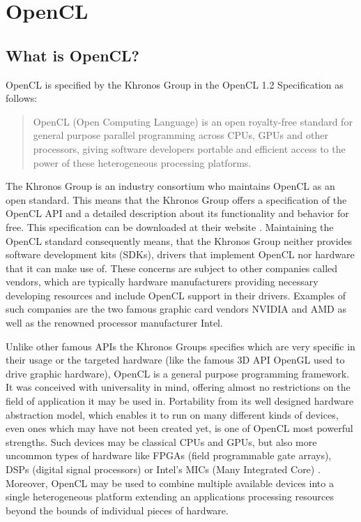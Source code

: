 \section{OpenCL}
\label{sec:opencl}

\subsection{What is OpenCL?}
OpenCL is specified by the Khronos Group in the OpenCL 1.2 Specification as follows:

\begin{quote}
OpenCL (Open Computing Language) is an open royalty-free standard for general purpose
parallel programming across CPUs, GPUs and other processors, giving software developers
portable and efficient access to the power of these heterogeneous processing platforms. \cite{opencl_spec}
\end{quote}

The Khronos Group is an industry consortium who maintains OpenCL as an open standard. This means that the Khronos Group offers a specification of the OpenCL API and a detailed description about its functionality and behavior for free. This specification can be downloaded at their website \cite{opencl_spec}. Maintaining the OpenCL standard consequently means, that the Khronos Group neither provides software development kits (SDKs), drivers that implement OpenCL nor hardware that it can make use of. These concerns are subject to other companies called vendors, which are typically hardware manufacturers providing necessary developing resources and include OpenCL support in their drivers. Examples of such companies are the two famous graphic card vendors NVIDIA and AMD as well as the renowned processor manufacturer Intel.

Unlike other famous APIs the Khronos Groups specifies which are very specific in their usage or the targeted hardware (like the famous 3D API OpenGL used to drive graphic hardware), OpenCL is a general purpose programming framework. It was conceived with universality in mind, offering almost no restrictions on the field of application it may be used in. Portability from its well designed hardware abstraction model, which enables it to run on many different kinds of devices, even ones which may have not been created yet, is one of OpenCL most powerful strengths. Such devices may be classical CPUs and GPUs, but also more uncommon types of hardware like FPGAs (field programmable gate arrays), DSPs (digital signal processors) or Intel's MICs (Many Integrated Core) \cite{mic}. Moreover, OpenCL may be used to combine multiple available devices into a single heterogeneous platform extending an applications processing resources beyond the bounds of individual pieces of hardware.

